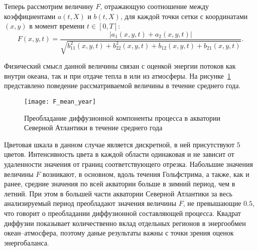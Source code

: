Теперь рассмотрим величину $F$, отражающую соотношение между коэффициентами $a(t,X)$ и $b(t,X)$, для каждой точки сетки с координатами $(x,y)$ в момент времени $t \in [0,T]$: 
\begin{equation}
	F(x,y,t) = \frac{|a_1(x,y,t) + a_2(x,y,t)|}{\sqrt{b_{11}^2(x,y,t) + b_{22}^2(x,y,t) + b_{12}(x,y,t) + b_{21}(x,y,t)}}.
\end{equation}

Физический смысл данной величины связан с оценкой энергии потоков как внутри океана, так и при отдаче тепла в или из атмосферы. 
На рисунке~\ref{fig_f_mean_year} представлено поведение рассматриваемой величины в течение среднего года.


\begin{figure}[!h]
	\centering
	\texttt{[image: F\_mean\_year]}
	\caption{Преобладание диффузионной компоненты процесса в акватории Северной Атлантики в течение среднего года}
	\label{fig_f_mean_year}
\end{figure}

Цветовая шкала в данном случае является дискретной, в ней присутствуют $5$ цветов. Интенсивность цвета в каждой области одинаковая и не зависит от удаленности значения от границ соответствующего отрезка. Набольшие значения величины $F$ возникают, в основном, вдоль течения Гольфстрима, а также, как и ранее, средние значения по всей акватории больше в зимний период, чем в летний. При этом в большей части акватории Северной Атлантики за весь анализируемый период преобладают значения величины $F$, не превышающие $0.5$, что говорит о преобладании диффузионной составляющей процесса. Квадрат диффузии показывает количественно вклад отдельных регионов в энергообмен океан--атмосфера, поэтому даные результаты важны с точки зрения оценок энергобаланса.

